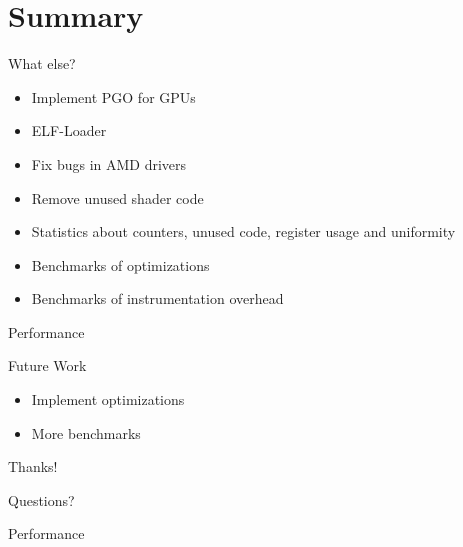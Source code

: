\documentclass[xcolor={usenames,dvipsnames}, aspectratio=169, 12pt]{beamer}
\begin{document}
\section{Summary}

\begin{frame}{What else?}
\begin{itemize}
	\item Implement PGO for GPUs
	\item ELF-Loader
	\item Fix bugs in AMD drivers
	\item Remove unused shader code
	\item Statistics about counters, unused code, register usage and uniformity
	\item Benchmarks of optimizations
	\item Benchmarks of instrumentation overhead
\end{itemize}
\end{frame}

{\framelogo{\centering}
\begin{frame}{Performance}

\end{frame}}

\begin{frame}{Future Work}
\begin{itemize}
	\item Implement optimizations
	\item More benchmarks
\end{itemize}
\end{frame}

\begin{tumplainframe}{Thanks!}
\begin{center}
	\Huge Questions?
\end{center}
\end{tumplainframe}

\begin{frame}{Performance}
\end{frame}
\end{document}
